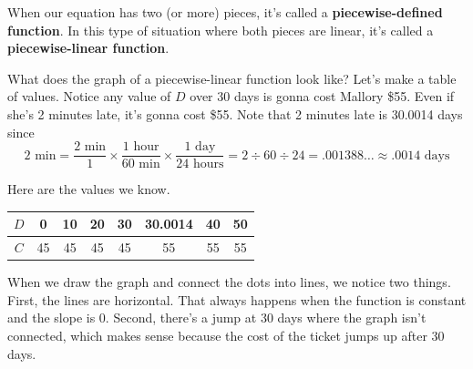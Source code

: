 When our equation has two (or more) pieces, it's called a \textbf{piecewise-defined function}.  In this type of situation where both pieces are linear, it's called a \textbf{piecewise-linear function}.

What does the graph of a piecewise-linear function look like?  Let's make a table of values. Notice any value of $D$ over 30 days is gonna cost Mallory \$55.  Even if she's 2 minutes late, it's gonna cost \$55.  Note that 2 minutes late is 30.0014 days since 
$$ 2 \text{ min}  = \frac{2 \text{ min}}{1} \times  \frac{1 \text{ hour}}{60 \text{ min}}\times \frac{1 \text{ day}}{24 \text{ hours}} = 2 \div 60 \div 24 = .001388\ldots \approx .0014 \text{ days}$$

Here are the values we know.
\begin{center}
\begin{tabular}{c|c|c|c|c|c|c|c}
    $D$ & 0 & 10 & 20 & 30 & 30.0014 & 40 & 50 \\ \hline
    $C$ & 45 & 45 & 45 & 45 & 55 & 55 & 55
\end{tabular}
\end{center}

When we draw the graph and connect the dots into lines, we notice two things. First, the lines are horizontal.  That always happens when the function is constant and the slope is 0.  Second, there's a jump at 30 days where the graph isn't connected, which makes sense because the cost of the ticket jumps up after 30 days.

\begin{center}
\end{center}

